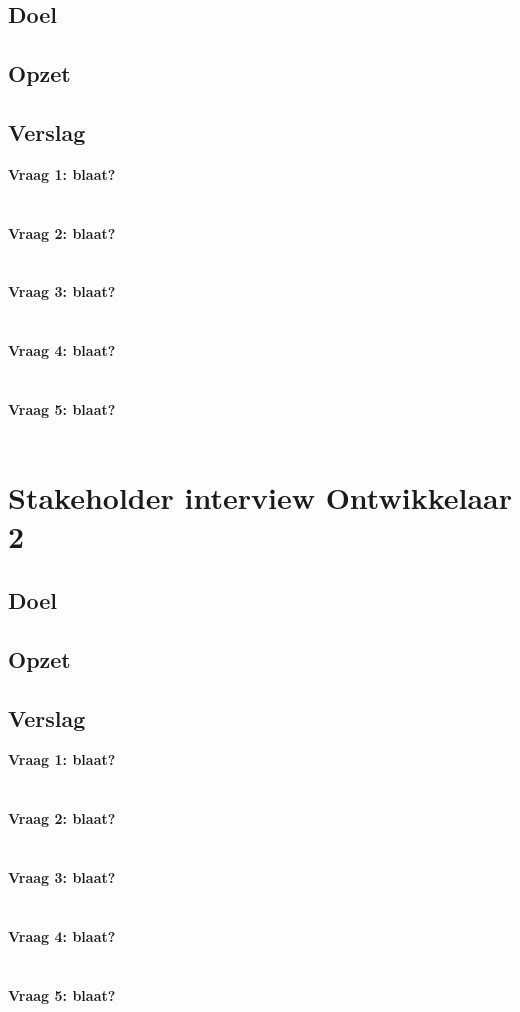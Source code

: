 \subsection{Doel}
\subsection{Opzet}
\subsection{Verslag}
\textbf{Vraag 1: blaat?}\\
\lipsum[01]\\
\\
\textbf{Vraag 2: blaat?}\\
\lipsum[02]\\
\\
\textbf{Vraag 3: blaat?}\\
\lipsum[03]\\
\\
\textbf{Vraag 4: blaat?}\\
\lipsum[04]\\
\\
\textbf{Vraag 5: blaat?}\\
\lipsum[05]\\


\section{Stakeholder interview Ontwikkelaar 2}
\subsection{Doel}
\subsection{Opzet}
\subsection{Verslag}
\textbf{Vraag 1: blaat?}\\
\lipsum[01]\\
\\
\textbf{Vraag 2: blaat?}\\
\lipsum[02]\\
\\
\textbf{Vraag 3: blaat?}\\
\lipsum[03]\\
\\
\textbf{Vraag 4: blaat?}\\
\lipsum[04]\\
\\
\textbf{Vraag 5: blaat?}\\
\lipsum[05]\\



